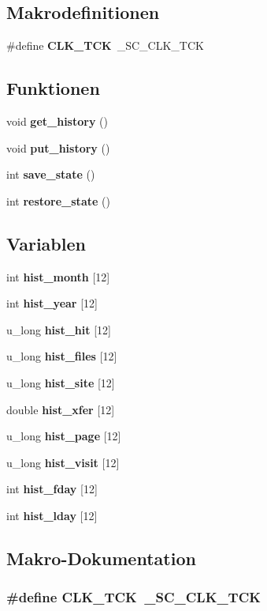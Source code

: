 \subsection*{Makrodefinitionen}
\begin{CompactItemize}
\item 
\#define {\bf CLK\_\-TCK}~\_\-SC\_\-CLK\_\-TCK
\end{CompactItemize}
\subsection*{Funktionen}
\begin{CompactItemize}
\item 
void {\bf get\_\-history} ()
\item 
void {\bf put\_\-history} ()
\item 
int {\bf save\_\-state} ()
\item 
int {\bf restore\_\-state} ()
\end{CompactItemize}
\subsection*{Variablen}
\begin{CompactItemize}
\item 
int {\bf hist\_\-month} [12]
\item 
int {\bf hist\_\-year} [12]
\item 
u\_\-long {\bf hist\_\-hit} [12]
\item 
u\_\-long {\bf hist\_\-files} [12]
\item 
u\_\-long {\bf hist\_\-site} [12]
\item 
double {\bf hist\_\-xfer} [12]
\item 
u\_\-long {\bf hist\_\-page} [12]
\item 
u\_\-long {\bf hist\_\-visit} [12]
\item 
int {\bf hist\_\-fday} [12]
\item 
int {\bf hist\_\-lday} [12]
\end{CompactItemize}


\subsection{Makro-Dokumentation}
\subsubsection{\setlength{\rightskip}{0pt plus 5cm}\#define CLK\_\-TCK~\_\-SC\_\-CLK\_\-TCK}\label{preserve_8c_03df76d1f70664d745ca8de2864e39b3}




